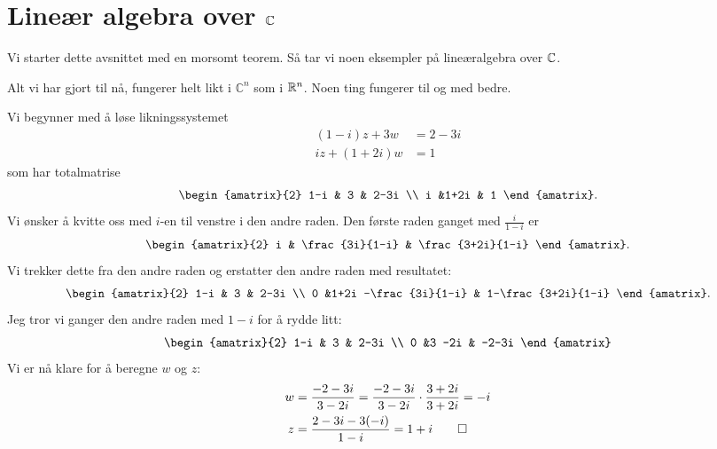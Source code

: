 \section*{Lineær algebra over $\mathbb{C}$}

Vi starter dette avsnittet med en morsomt teorem. Så tar vi noen eksempler på lineæralgebra over $\mathbb{C}$.

\begin{fishythm}
Alt vi har gjort til nå, fungerer helt likt i $\mathbb C^n$ som i $\mathbb{R}^n$. 
Noen ting fungerer til og med bedre.
\end{fishythm}




\begin{ex}
Vi begynner med å løse likningssystemet
\begin{align*}
(1-i) z + 3w   &= 2-3i \\
i z + (1+2i) w &= 1
\end{align*}
som har totalmatrise
\[
\begin{amatrix}{2}
1-i & 3 & 2-3i \\ i &1+2i & 1
\end{amatrix}.
\]
Vi ønsker å kvitte oss med $i$-en til venstre i den andre raden. 
Den første raden ganget  med $\frac{i}{1-i}$ er
\[
\begin{amatrix}{2}
i & \frac{3i}{1-i} & \frac{3+2i}{1-i} 
\end{amatrix}.
\]
Vi trekker dette fra den andre raden og erstatter den andre raden med resultatet:
\[
\begin{amatrix}{2}
1-i & 3 & 2-3i \\ 0 &1+2i -\frac{3i}{1-i} & 1-\frac{3+2i}{1-i} 
\end{amatrix}.
\]
Jeg tror vi ganger den andre raden med $1-i$ for å rydde litt:
\[
\begin{amatrix}{2}
1-i & 3 & 2-3i \\ 0 &3 -2i  & -2-3i
\end{amatrix}
\]
Vi er nå klare for å beregne $w$ og $z$:
\begin{align*}
w&=\frac{-2-3i}{3-2i}=\frac{-2-3i}{3-2i}\cdot \frac{3+2i}{3+2i}=-i \\
z&=\frac{2-3i-3(-i)}{1-i}=1+i \qedhere
\end{align*}
\end{ex}


